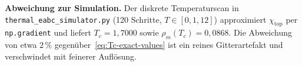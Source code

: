 \documentclass[11pt,a4paper]{article}
\begin{document}
\medskip
\noindent\textbf{Abweichung zur Simulation.} Der diskrete Temperaturscan in \texttt{thermal\_eabc\_simulator.py} (120 Schritte, $T \in [0{,}1, 12]$) approximiert $\chi_{\text{top}}$ per \texttt{np.gradient} und liefert $T_c = 1{,}7000$ sowie $\rho_m(T_c) = 0{,}0868$. Die Abweichung von etwa $2\,\%$ gegen\"uber~\eqref{eq:Tc-exact-values} ist ein reines Gitterartefakt und verschwindet mit feinerer Aufl\"osung.
\end{document}
